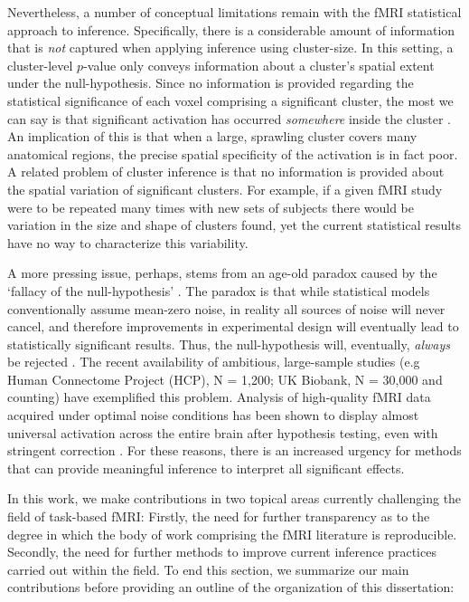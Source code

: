 Nevertheless, a number of conceptual limitations remain with the fMRI statistical approach to inference. Specifically, there is a considerable amount of information that is \textit{not} captured when applying inference using cluster-size. In this setting, a cluster-level $p$-value only conveys information about a cluster's spatial extent under the null-hypothesis. Since no information is provided regarding the statistical significance of each voxel comprising a significant cluster, the most we can say is that significant activation has occurred \textit{somewhere} inside the cluster \citep{Woo2014-ji}. An implication of this is that when a large, sprawling cluster covers many anatomical regions, the precise spatial specificity of the activation is in fact poor. A related problem of cluster inference is that no information is provided about the spatial variation of significant clusters. For example, if a given fMRI study were to be repeated many times with new sets of subjects there would be variation in the size and shape of clusters found, yet the current statistical results have no way to characterize this variability.

A more pressing issue, perhaps, stems from an age-old paradox caused by the `fallacy of the null-hypothesis' \citep{Rozeboom1960-dp}. The paradox is that while statistical models conventionally assume mean-zero noise, in reality all sources of noise will never cancel, and therefore improvements in experimental design will eventually lead to statistically significant results. Thus, the null-hypothesis will, eventually, \textit{always} be rejected \citep{Meehl1967-ij}. The recent availability of ambitious, large-sample studies (e.g Human Connectome Project (HCP), N = 1,200; UK Biobank, N = 30,000 and counting) have exemplified this problem. Analysis of high-quality fMRI data acquired under optimal noise conditions has been shown to display almost universal activation across the entire brain after hypothesis testing, even with stringent correction \citep{Gonzalez-Castillo2012-do}. For these reasons, there is an increased urgency for methods that can provide meaningful inference to interpret all significant effects. 

\bigskip

\noindent In this work, we make contributions in two topical areas currently challenging the field of task-based fMRI: Firstly, the need for further transparency as to the degree in which the body of work comprising the fMRI literature is reproducible. Secondly, the need for further methods to improve current inference practices carried out within the field. To end this section, we summarize our main contributions before providing an outline of the organization of this dissertation: 

